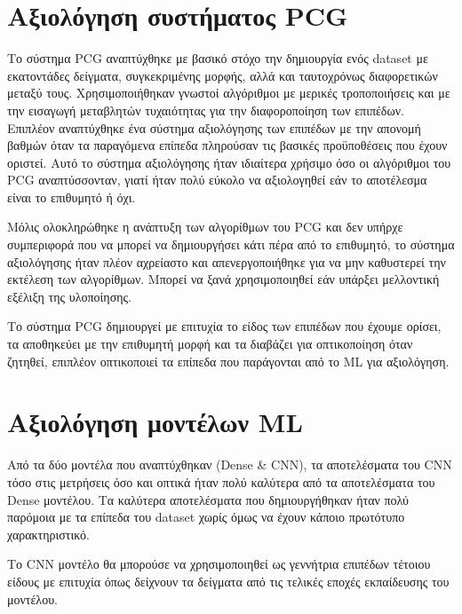 \section{Αξιολόγηση συστήματος PCG}
\par
Το σύστημα PCG αναπτύχθηκε με βασικό στόχο την δημιουργία ενός dataset με εκατοντάδες δείγματα, συγκεκριμένης μορφής, αλλά και ταυτοχρόνως διαφορετικών μεταξύ τους. Χρησιμοποιήθηκαν γνωστοί αλγόριθμοι με μερικές τροποποιήσεις και με την εισαγωγή μεταβλητών τυχαιότητας για την διαφοροποίηση των επιπέδων. Επιπλέον αναπτύχθηκε ένα σύστημα αξιολόγησης των επιπέδων με την απονομή βαθμών όταν τα παραγόμενα επίπεδα πληρούσαν τις βασικές προϋποθέσεις που έχουν οριστεί. Αυτό το σύστημα αξιολόγησης ήταν ιδιαίτερα χρήσιμο όσο οι αλγόριθμοι του PCG αναπτύσσονταν, γιατί ήταν πολύ εύκολο να αξιολογηθεί εάν το αποτέλεσμα είναι το επιθυμητό ή όχι.
\par
Μόλις ολοκληρώθηκε η ανάπτυξη των αλγορίθμων του PCG και δεν υπήρχε συμπεριφορά που να μπορεί να δημιουργήσει κάτι πέρα από το επιθυμητό, το σύστημα αξιολόγησης ήταν πλέον αχρείαστο και απενεργοποιήθηκε για να μην καθυστερεί την εκτέλεση των αλγορίθμων. Μπορεί να ξανά χρησιμοποιηθεί εάν υπάρξει μελλοντική εξέλιξη της υλοποίησης.
\par
Το σύστημα PCG δημιουργεί με επιτυχία το είδος των επιπέδων που έχουμε ορίσει, τα αποθηκεύει με την επιθυμητή μορφή και τα διαβάζει για οπτικοποίηση όταν ζητηθεί, επιπλέον οπτικοποιεί τα επίπεδα που παράγονται από το ML για αξιολόγηση.



\section{Αξιολόγηση μοντέλων ML}
\par
Από τα δύο μοντέλα που αναπτύχθηκαν (Dense \& CNN), τα αποτελέσματα του CNN τόσο στις μετρήσεις όσο και οπτικά ήταν πολύ καλύτερα από τα αποτελέσματα του Dense μοντέλου. Τα καλύτερα αποτελέσματα που δημιουργήθηκαν ήταν πολύ παρόμοια με τα επίπεδα του dataset χωρίς όμως να έχουν κάποιο πρωτότυπο χαρακτηριστικό.
\par
Το CNN μοντέλο θα μπορούσε να χρησιμοποιηθεί ως γεννήτρια επιπέδων τέτοιου είδους με επιτυχία όπως δείχνουν τα δείγματα από τις τελικές εποχές εκπαίδευσης του μοντέλου.


